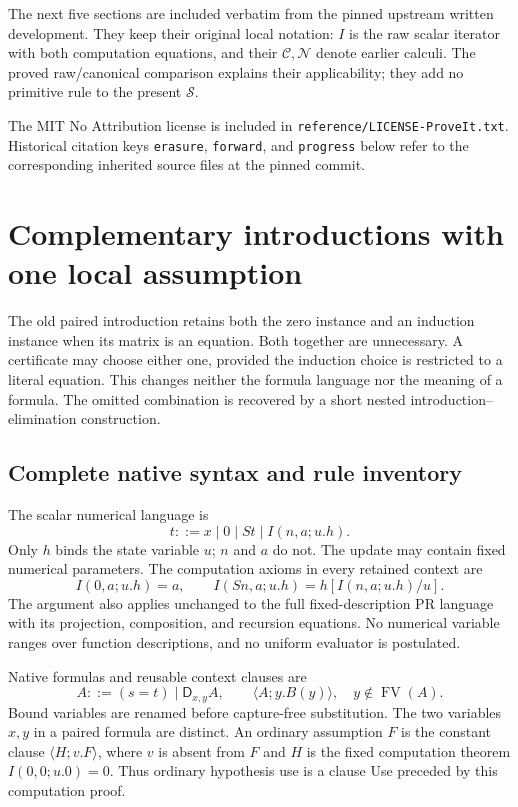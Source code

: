 \documentclass[11pt,a4paper]{article}
\theoremstyle{definition}
\begin{document}
The next five sections are included verbatim from the pinned upstream
written development. They keep their original local notation:
\(I\) is the raw scalar iterator with both computation equations, and
their \(\mathcal C,\mathcal N\) denote earlier calculi.
The proved raw/canonical comparison explains their applicability;
they add no primitive rule to the present \(\mathcal S\).

The MIT No Attribution license is included in
\texttt{reference/LICENSE-ProveIt.txt}. Historical citation keys
\texttt{erasure}, \texttt{forward}, and \texttt{progress} below refer
to the corresponding inherited source files at the pinned commit.


\section{Complementary introductions with one local assumption}
\label{sec:choice-introduction}

The old paired introduction retains both the zero instance and an
induction instance when its matrix is an equation. Both together are
unnecessary. A certificate may choose either one, provided the induction
choice is restricted to a literal equation. This changes neither the
formula language nor the meaning of a formula. The omitted combination
is recovered by a short nested introduction--elimination construction.

\subsection{Complete native syntax and rule inventory}

The scalar numerical language is
\[
 t::=x\mid0\mid St\mid I(n,a;u.h).
\]
Only $h$ binds the state variable $u$; $n$ and $a$ do not.
The update may contain fixed numerical parameters. The computation
axioms in every retained context are
\[
 I(0,a;u.h)=a,\qquad
 I(Sn,a;u.h)=h[I(n,a;u.h)/u].
 \tag{I0, IS}\label{eq:choice-computations}
\]
The argument also applies unchanged to the full fixed-description PR
language with its projection, composition, and recursion equations.
No numerical variable ranges over function descriptions, and no uniform
evaluator is postulated.

Native formulas and reusable context clauses are
\[
 A::=(s=t)\mid\mathsf D_{x,y}A,\qquad
 \langle A;y.B(y)\rangle,\quad y\notin\operatorname{FV}(A).
\]
Bound variables are renamed before capture-free substitution.
The two variables $x,y$ in a paired formula are distinct.
An ordinary assumption $F$ is the constant clause
$\langle H;v.F\rangle$, where $v$ is absent from $F$ and $H$ is the
fixed computation theorem $I(0,0;u.0)=0$. Thus ordinary hypothesis
use is a clause Use preceded by this computation proof.
\end{document}
